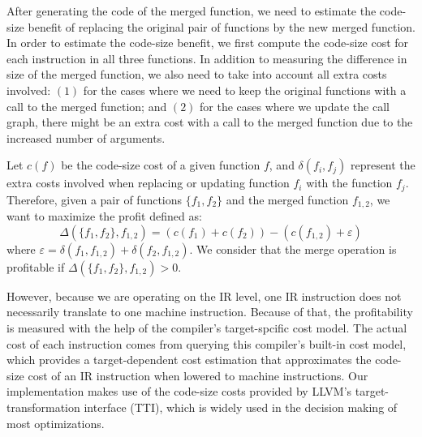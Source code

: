 After generating the code of the merged function, we need to estimate the
code-size benefit of replacing the original pair of functions by the new merged
function.
In order to estimate the code-size benefit, we first compute the code-size cost
for each instruction in all three functions.
In addition to measuring the difference in size of the merged function, we also
need to take into account all extra costs involved:
$(1)$ for the cases where we need to keep the original functions with a call to
the merged function;
and $(2)$ for the cases where we update the call graph, there might be an extra
cost with a call to the merged function due to the increased number of arguments.

Let $c(f)$ be the code-size cost of a given function $f$, and
$\delta(f_i, f_j)$ represent the extra costs involved when replacing or
updating function $f_i$ with the function $f_j$.
Therefore, given a pair of functions $\{f_1,f_2\}$ and the merged function
$f_{1,2}$, we want to maximize the profit defined as:
\[
  \Delta(\{f_1,f_2\},f_{1,2}) = (c(f_1)+c(f_2)) - (c(f_{1,2}) + \varepsilon)
\]
where $\varepsilon = \delta(f_1, f_{1,2}) + \delta(f_2, f_{1,2})$.
We consider that the merge operation is profitable if $\Delta(\{f_1,f_2\},f_{1,2})>0$.

However, because we are operating on the IR level, one IR instruction does not
necessarily translate to one machine instruction.
Because of that, the profitability is measured with the help of the compiler's
target-spcific cost model.
The actual cost of each instruction comes from querying this compiler's built-in
cost model, which provides a target-dependent cost estimation that approximates
the code-size cost of an IR instruction when lowered to machine instructions.
Our implementation makes use of the code-size costs provided by LLVM's
target-transformation interface (TTI), which is widely used in the decision
making of most optimizations.
